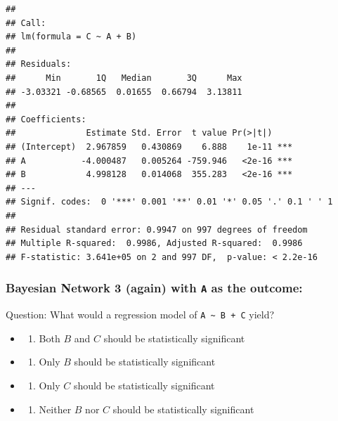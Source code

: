 \documentclass[
]{article}
\providecommand{\tightlist}{%
  \setlength{\itemsep}{0pt}\setlength{\parskip}{0pt}}
\begin{document}
\begin{verbatim}
## 
## Call:
## lm(formula = C ~ A + B)
## 
## Residuals:
##      Min       1Q   Median       3Q      Max 
## -3.03321 -0.68565  0.01655  0.66794  3.13811 
## 
## Coefficients:
##              Estimate Std. Error  t value Pr(>|t|)    
## (Intercept)  2.967859   0.430869    6.888    1e-11 ***
## A           -4.000487   0.005264 -759.946   <2e-16 ***
## B            4.998128   0.014068  355.283   <2e-16 ***
## ---
## Signif. codes:  0 '***' 0.001 '**' 0.01 '*' 0.05 '.' 0.1 ' ' 1
## 
## Residual standard error: 0.9947 on 997 degrees of freedom
## Multiple R-squared:  0.9986, Adjusted R-squared:  0.9986 
## F-statistic: 3.641e+05 on 2 and 997 DF,  p-value: < 2.2e-16
\end{verbatim}

\hypertarget{bayesian-network-3-again-with-a-as-the-outcome}{%
\subsubsection{\texorpdfstring{Bayesian Network 3 (again) with
\texttt{A} as the
outcome:}{Bayesian Network 3 (again) with A as the outcome:}}\label{bayesian-network-3-again-with-a-as-the-outcome}}

\hypertarget{htmlwidget-35db85c5527a6bd5601b}{}
\begin{grViz}

\end{grViz}

Question: What would a regression model of
\texttt{A\ \textasciitilde{}\ B\ +\ C} yield?

\begin{itemize}
\item
  \begin{enumerate}
  \def\labelenumi{\alph{enumi})}
  \tightlist
  \item
    Both \(B\) and \(C\) should be statistically significant
  \end{enumerate}
\item
  \begin{enumerate}
  \def\labelenumi{\alph{enumi})}
  \setcounter{enumi}{1}
  \tightlist
  \item
    Only \(B\) should be statistically significant
  \end{enumerate}
\item
  \begin{enumerate}
  \def\labelenumi{\alph{enumi})}
  \setcounter{enumi}{2}
  \tightlist
  \item
    Only \(C\) should be statistically significant
  \end{enumerate}
\item
  \begin{enumerate}
  \def\labelenumi{\alph{enumi})}
  \setcounter{enumi}{3}
  \tightlist
  \item
    Neither \(B\) nor \(C\) should be statistically significant
  \end{enumerate}
\end{itemize}
\end{document}
